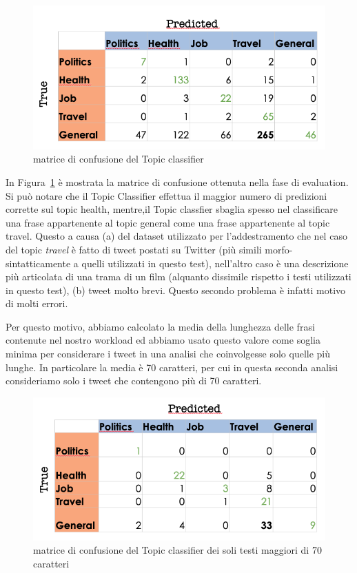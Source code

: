 \begin{figure}[h!t]
    \centering
    \includegraphics[width=15cm]{Figure/qualitativa/qual_topic.png}
    \caption{matrice di confusione del Topic classifier}
    \label{fig:confMtrTopicClass}
\end{figure}
\FloatBarrier

In Figura~\ref{fig:confMtrTopicClass} è mostrata la matrice di confusione ottenuta nella fase di evaluation. Si può notare che il Topic Classifier effettua il maggior numero di predizioni corrette sul topic health, mentre,il Topic classfier sbaglia spesso nel classificare una frase appartenente al topic general come una frase appartenente al topic travel. Questo a causa (a) del dataset utilizzato per l'addestramento che nel caso del topic \textit{travel} è fatto di tweet postati su Twitter (più simili morfo-sintatticamente a quelli utilizzati in questo test), nell'altro caso è una descrizione più articolata di una trama di un film (alquanto dissimile rispetto i testi utilizzati in questo test), (b) tweet molto brevi. Questo secondo problema è infatti motivo di molti errori.

Per questo motivo, abbiamo calcolato la media della lunghezza delle frasi contenute nel nostro workload ed abbiamo usato questo valore come soglia minima per considerare i tweet in una analisi che coinvolgesse solo quelle più lunghe. In particolare la media è 70 caratteri, per cui in questa seconda analisi consideriamo solo i tweet che contengono più di 70 caratteri.

\begin{figure}[h!t]
    \centering
    \includegraphics[width=15cm]{Figure/qualitativa/qual70char.png}
    \caption{matrice di confusione del Topic classifier dei soli testi maggiori di 70 caratteri}
    \label{fig:confMtrTopicClassGT70}
\end{figure}
\FloatBarrier

